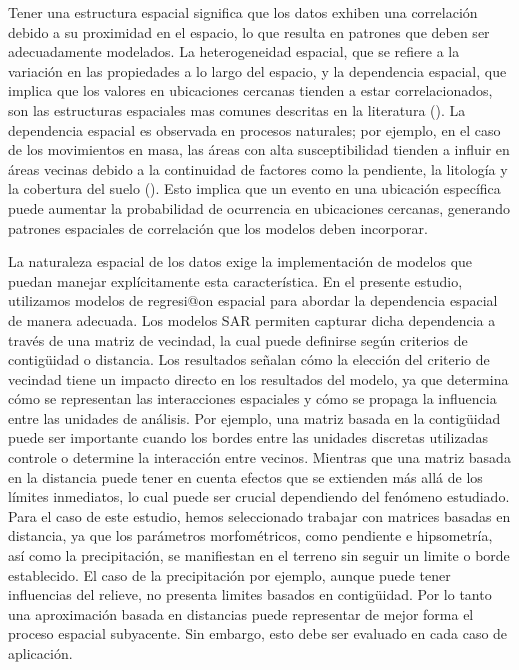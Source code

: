 \documentclass[
  manuscript=article,  
  layout=preprint,  
  year=2023,
  volume=0,
]{format}
\begin{document}
Tener una estructura espacial significa que los datos exhiben una correlación debido a su proximidad en el espacio, lo que resulta en patrones que deben ser adecuadamente modelados. La heterogeneidad espacial, que se refiere a la variación en las propiedades a lo largo del espacio, y la dependencia espacial, que implica que los valores en ubicaciones cercanas tienden a estar correlacionados, son las estructuras espaciales mas comunes descritas en la literatura (\cite{anselin1988spatial, rey2023geographic}). La dependencia espacial es observada en procesos naturales; por ejemplo, en el caso de los movimientos en masa, las áreas con alta susceptibilidad tienden a influir en áreas vecinas debido a la continuidad de factores como la pendiente, la litología y la cobertura del suelo (\cite{samia2019dynamic}). Esto implica que un evento en una ubicación específica puede aumentar la probabilidad de ocurrencia en ubicaciones cercanas, generando patrones espaciales de correlación que los modelos deben incorporar.

La naturaleza espacial de los datos exige la implementación de modelos que puedan manejar explícitamente esta característica. En el presente estudio, utilizamos modelos de regresi@on espacial para abordar la dependencia espacial de manera adecuada. Los modelos SAR permiten capturar dicha dependencia a través de una matriz de vecindad, la cual puede definirse según criterios de contigüidad o distancia. Los resultados señalan cómo la elección del criterio de vecindad tiene un impacto directo en los resultados del modelo, ya que determina cómo se representan las interacciones espaciales y cómo se propaga la influencia entre las unidades de análisis. Por ejemplo, una matriz basada en la contigüidad puede ser importante cuando los bordes entre las unidades discretas utilizadas controle o determine la interacción entre vecinos. Mientras que una matriz basada en la distancia puede tener en cuenta efectos que se extienden más allá de los límites inmediatos, lo cual puede ser crucial dependiendo del fenómeno estudiado. Para el caso de este estudio, hemos seleccionado trabajar con matrices basadas en distancia, ya que los parámetros morfométricos, como pendiente e hipsometría, así como la precipitación, se manifiestan en el terreno sin seguir un limite o borde establecido. El caso de la precipitación por ejemplo, aunque puede tener influencias del relieve, no presenta limites basados en contigüidad. Por lo tanto una aproximación basada en distancias puede representar de mejor forma el proceso espacial subyacente. Sin embargo, esto debe ser evaluado en cada caso de aplicación.
\end{document}
